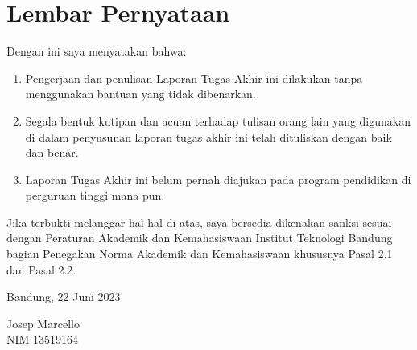 \chapter*{Lembar Pernyataan}

Dengan ini saya menyatakan bahwa:

\begin{enumerate}

    \item Pengerjaan dan penulisan Laporan Tugas Akhir ini dilakukan tanpa
	menggunakan bantuan yang tidak dibenarkan.
    \item Segala bentuk kutipan dan acuan terhadap tulisan orang lain yang
	digunakan di dalam penyusunan laporan tugas akhir ini telah dituliskan
	dengan baik dan benar.
    \item Laporan Tugas Akhir ini belum pernah diajukan pada program pendidikan
	di perguruan tinggi mana pun.

\end{enumerate}

Jika terbukti melanggar hal-hal di atas, saya bersedia dikenakan sanksi sesuai
dengan Peraturan Akademik dan Kemahasiswaan Institut Teknologi Bandung bagian
Penegakan Norma Akademik dan Kemahasiswaan khususnya Pasal 2.1 dan Pasal 2.2.

\vspace{10mm}

Bandung, 22 Juni 2023

\vspace{30mm}

Josep Marcello \\
NIM 13519164
